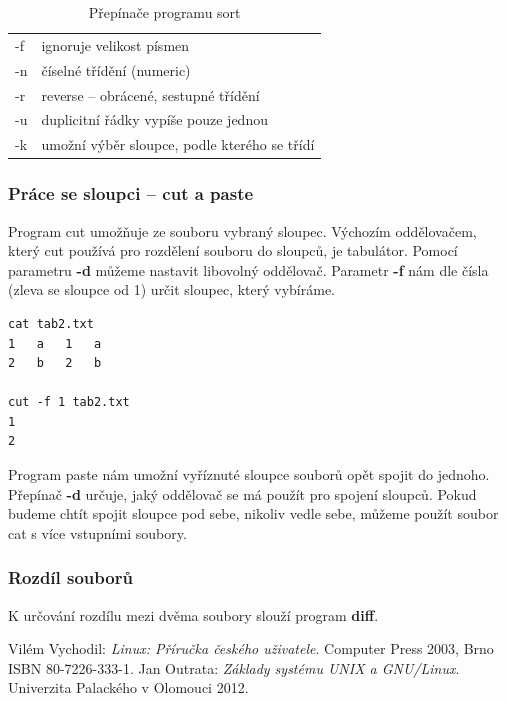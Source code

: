 \documentclass{article}
\begin{document}
\begin{table}
\begin{center}
\begin{tabular}{l l}
-f & ignoruje velikost písmen\\
-n & číselné třídění (numeric)\\
-r & reverse -- obrácené, sestupné třídění\\
-u & duplicitní řádky vypíše pouze jednou\\
-k & umožní výběr sloupce, podle kterého se třídí\\
\end{tabular}
\caption{Přepínače programu sort}
\end{center}
\label{tabSort}
\end{table}

\subsubsection{Práce se sloupci -- cut a paste}
Program cut umožňuje ze souboru  vybraný sloupec. Výchozím oddělovačem, který cut používá pro rozdělení souboru do sloupců, je tabulátor. Pomocí parametru \textbf{-d} můžeme nastavit libovolný oddělovač. Parametr \textbf{-f} nám dle čísla (zleva se sloupce  od 1) určit sloupec, který vybíráme.

\begin{verbatim}
cat tab2.txt
1	a	1	a
2	b	2	b 
	
cut -f 1 tab2.txt
1
2
\end{verbatim}

Program paste nám umožní vyříznuté sloupce souborů opět spojit do jednoho. Přepínač \textbf{-d} určuje, jaký oddělovač se má použít pro spojení sloupců. Pokud budeme chtít spojit sloupce pod sebe, nikoliv vedle sebe, můžeme použít soubor cat s více vstupními soubory.


\subsubsection{Rozdíl souborů}
K určování rozdílu mezi dvěma soubory slouží program \textbf{diff}. 


\newpage
\begin{thebibliography}{0}
  Vilém Vychodil: \emph{Linux: Příručka českého uživatele}. Computer Press 2003, Brno ISBN 80-7226-333-1. 
  Jan Outrata: \emph{Základy systému UNIX a GNU/Linux}. Univerzita Palackého v Olomouci 2012.
  
\end{thebibliography}
\end{document}
